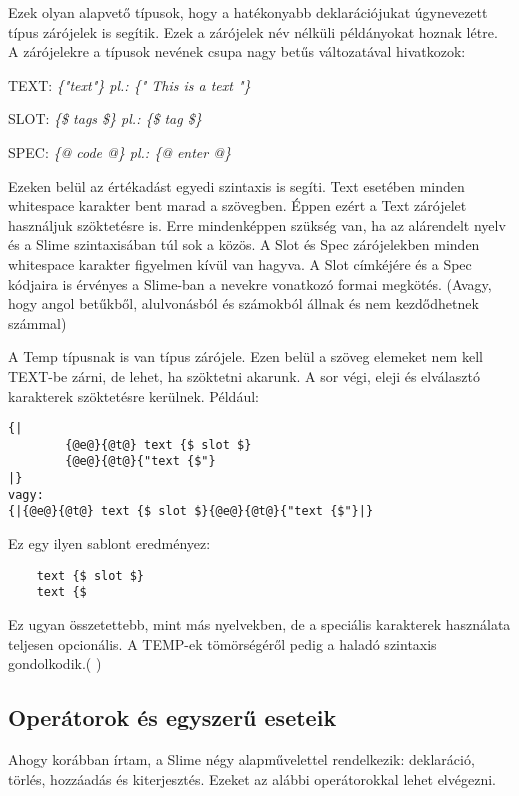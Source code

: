 Ezek olyan alapvető típusok, hogy a hatékonyabb deklarációjukat úgynevezett típus zárójelek is segítik. 
Ezek a zárójelek név nélküli példányokat hoznak létre.
A zárójelekre a típusok nevének csupa nagy betűs változatával hivatkozok:

TEXT: \textit{\{"text"\} pl.: \{" This is a text "\}}

SLOT: \textit{\{\$ tags \$\} pl.: \{\$ tag \$\}}

SPEC: \textit{\{@ code @\} pl.: \{@ enter @\}}

Ezeken belül az értékadást egyedi szintaxis is segíti.
Text esetében minden whitespace karakter bent marad a szövegben.
Éppen ezért a Text zárójelet használjuk szöktetésre is.
Erre mindenképpen szükség van, ha az alárendelt nyelv és a Slime szintaxisában túl sok a közös.
A Slot és Spec zárójelekben minden whitespace karakter figyelmen kívül van hagyva. 
A Slot címkéjére és a Spec kódjaira is érvényes a Slime-ban a nevekre vonatkozó formai megkötés.
(Avagy, hogy angol betűkből, alulvonásból és számokból állnak és nem kezdődhetnek számmal)

A Temp típusnak is van típus zárójele. 
Ezen belül a szöveg elemeket nem kell TEXT-be zárni, de lehet, ha szöktetni akarunk. 
A sor végi, eleji és elválasztó karakterek szöktetésre kerülnek. Például:\begin{verbatim}
{| 
		{@e@}{@t@} text {$ slot $} 
		{@e@}{@t@}{"text {$"}
|}
vagy:
{|{@e@}{@t@} text {$ slot $}{@e@}{@t@}{"text {$"}|}
\end{verbatim}Ez egy ilyen sablont eredményez:

\begin{verbatim}
    text {$ slot $}
    text {$ 
\end{verbatim}

Ez ugyan összetettebb, mint más nyelvekben, de a speciális karakterek használata teljesen opcionális.
A TEMP-ek tömörségéről pedig a haladó szintaxis gondolkodik.( )


\subsection{Operátorok és egyszerű eseteik}
\label{sec:SOper}
Ahogy korábban írtam, a Slime négy alapművelettel rendelkezik: deklaráció, törlés, hozzáadás és kiterjesztés. 
Ezeket az alábbi operátorokkal lehet elvégezni.

